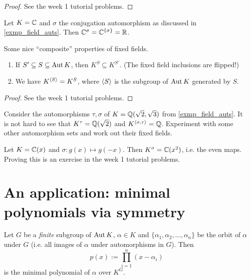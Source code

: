 \begin{proof}
    See the week 1 tutorial problems.
\end{proof}

\begin{example}
    Let $K = \mathbb{{C}}$ and $\sigma$ the conjugation automorphism as discussed in \cref{exmp_field_auts}. Then $\mathbb{{C}}^{\sigma} = \mathbb{{C}}^{\{\sigma\}} = \mathbb{{R}}$.
\end{example}

\begin{proposition}
    Some nice ``composite'' properties of fixed fields.
    \begin{enumerate}[label=(\alph*)]
        \item If $S' \subseteq S \subseteq \operatorname{Aut}{K}$, then $K^{S} \subseteq K^{S'}$. (The fixed field inclusions are flipped!)
        \item We have $K^{\langle {S} \rangle} = K^{S}$, where $\langle {S} \rangle$ is the subgroup of $\operatorname{Aut}{K}$ generated by $S$.
    \end{enumerate}
\end{proposition}

\begin{proof}
    See the week 1 tutorial problems.
\end{proof}

\begin{example}
    Consider the automorphisms $\tau, \sigma$ of $K = \mathbb{{Q}}(\sqrt{2}, \sqrt{3})$ from \cref{exmp_field_auts}. It is not hard to see that $K^\tau = \mathbb{{Q}}(\sqrt{2})$ and $K^{\langle {\sigma, \tau} \rangle} = \mathbb{{Q}}$. Experiment with some other automorphism sets and work out their fixed fields.
\end{example}

\begin{example}
    Let $K = \mathbb{{C}}(x)$ and $\sigma: g(x) \longmapsto g(-x)$. Then $K^\sigma = \mathbb{{C}}(x^2)$, i.e. the even maps. Proving this is an exercise in the week 1 tutorial problems.
\end{example}

\section{An application: minimal polynomials via symmetry}

\begin{theorem}
\label{thm_aut_min_polys}
    Let $G$ be a \emph{finite} subgroup of $\operatorname{Aut}{K}$, $\alpha \in K$ and $\{\alpha_1, \alpha_2, \ldots, \alpha_n\}$ be the orbit of $\alpha$ under $G$ (i.e. all images of $\alpha$ under automorphisms in $G$). Then
    \[
        p(x) := \prod_{i = 1}^{n} (x - \alpha_i)
    \]
    is the minimal polynomial of $\alpha$ over $K^G$.
\end{theorem}

